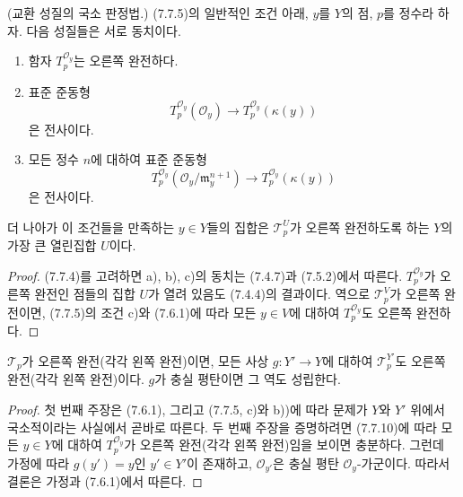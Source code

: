 \begin{proposition}[7.7.10]
\textnormal{(교환 성질의 국소 판정법.)} (7.7.5)의 일반적인 조건 아래,
$y$를 $Y$의 점, $p$를 정수라 하자. 다음 성질들은 서로 동치이다.
\begin{enumerate}
  \item[a)] 함자 $T_p^{\mathscr O_y}$는 오른쪽 완전하다.

  \item[b)] 표준 준동형
    \[
      T_p^{\mathscr O_y}(\mathscr O_y)
      \longrightarrow
      T_p^{\mathscr O_y}(\kappa(y))
    \]
    은 전사이다.

  \item[c)] 모든 정수 $n$에 대하여 표준 준동형
    \[
      T_p^{\mathscr O_y}
      (\mathscr O_y/\mathfrak m_y^{n+1})
      \longrightarrow
      T_p^{\mathscr O_y}(\kappa(y))
    \]
    은 전사이다.
\end{enumerate}
더 나아가 이 조건들을 만족하는 $y\in Y$들의 집합은
$\mathscr T_p^U$가 오른쪽 완전하도록 하는 $Y$의 가장 큰 열린집합
$U$이다.
\end{proposition}

\begin{proof}
(7.7.4)를 고려하면 a), b), c)의 동치는 (7.4.7)과 (7.5.2)에서 따른다.
$T_p^{\mathscr O_y}$가 오른쪽 완전인 점들의 집합 $U$가 열려 있음도
(7.4.4)의 결과이다. 역으로 $\mathscr T_p^V$가 오른쪽 완전이면,
(7.7.5)의 조건 c)와 (7.6.1)에 따라 모든 $y\in V$에 대하여
$T_p^{\mathscr O_y}$도 오른쪽 완전하다.
\end{proof}

\begin{corollary}[7.7.11]
$\mathscr T_p$가 오른쪽 완전(각각 왼쪽 완전)이면, 모든 사상
$g:Y'\to Y$에 대하여 $\mathscr T_p^{Y'}$도 오른쪽 완전(각각 왼쪽
완전)이다. $g$가 충실 평탄이면 그 역도 성립한다.
\end{corollary}

\begin{proof}
첫 번째 주장은 (7.6.1), 그리고 (7.7.5, c)와 b))에 따라 문제가 $Y$와
$Y'$ 위에서 국소적이라는 사실에서 곧바로 따른다. 두 번째 주장을
증명하려면 (7.7.10)에 따라 모든 $y\in Y$에 대하여
$T_p^{\mathscr O_y}$가 오른쪽 완전(각각 왼쪽 완전)임을 보이면 충분하다.
그런데 가정에 따라 $g(y')=y$인 $y'\in Y'$이 존재하고,
$\mathscr O_{y'}$은 충실 평탄 $\mathscr O_y$-가군이다. 따라서 결론은
가정과 (7.6.1)에서 따른다.
\end{proof}


